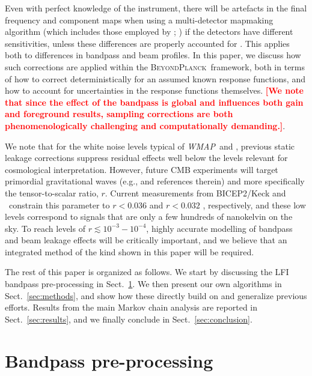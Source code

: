 \documentclass[twocolumn]{aa}
\def\WMAP{\textit{WMAP}}
\newcommand{\BP}{\textsc{BeyondPlanck}}
\newcommand{\?}[1]{\textcolor{red}{{\bf [#1]}}}
\begin{document}
Even with perfect knowledge of the instrument, there will be artefacts in the
final frequency and component maps when using a multi-detector mapmaking
algorithm (which includes those employed by \Planck;
\citealp{planck2016-l02,planck2016-l03}) if the detectors have different
sensitivities, unless these differences are properly accounted for
\citep[e.g.,][]{page2007,npipe,delouis:2019}. This applies both to differences
in bandpass and beam profiles. In this paper, we discuss how such corrections
are applied within the \BP\ framework, both in terms of how to correct
deterministically for an assumed known response functions, and how to account
for uncertainties in the response functions themselves. \?{\textbf{We note that
since the effect of the bandpass is global and influences both gain and
foreground results, sampling corrections are both phenomenologically challenging
and computationally demanding.}}.

We note that for the white noise levels typical of \WMAP\ and \Planck, 
previous static leakage corrections suppress residual effects well below the
levels relevant for cosmological interpretation. However, future CMB experiments
will target primordial gravitational waves (e.g., \citep{kamionkowski:2016} and
references therein) and more specifically the tensor-to-scalar ratio, $r$.
Current measurements from BICEP2/Keck and \Planck\ constrain this parameter to
$r<0.036$ \citep{bicep2021} and $r<0.032$ \citep{tristram:2021}, respectively,
and these low levels correspond to signals that are only a few hundreds
of nanokelvin on the sky. To reach levels of $r\lesssim10^{-3}-10^{-4}$, highly
accurate modelling of bandpass and beam leakage effects will be critically
important, and we believe that an integrated method of the kind shown in this paper will be required.

The rest of this paper is organized as follows. We start by discussing
the LFI bandpass pre-processing in Sect.~\ref{sec:newprofs}. We then
present our own algorithms in Sect.~\ref{sec:methods}, and show how
these directly build on and generalize previous efforts. Results from
the main Markov chain analysis are reported in
Sect.~\ref{sec:results}, and we finally conclude in
Sect.~\ref{sec:conclusion}.

\section{Bandpass pre-processing}
\label{sec:newprofs}
\end{document}
